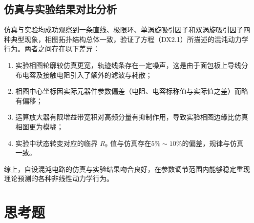 \documentclass[a4paper,8pt,twocolumn]{article}
\begin{document}
\subsection{仿真与实验结果对比分析}

仿真与实验均成功观察到一条直线、极限环、单涡旋吸引因子和双涡旋吸引因子四种典型现象，相图拓扑结构总体一致，验证了方程（DX2.1）所描述的混沌动力学行为。两者之间存在以下差异：

\begin{enumerate}[label=(\arabic*)]
  \item 实验相图轮廓较仿真更宽，轨迹线条存在一定噪声，这是由于面包板上导线分布电容及接触电阻引入了额外的滤波与耗散；
  \item 相图中心坐标因实际元器件参数偏差（电阻、电容标称值与实际值之差）而略有偏移；
  \item 运算放大器有限增益带宽积对高频分量有抑制作用，导致实验相图边缘比仿真相图更为模糊；
  \item 实验中状态转变对应的临界 $R_9$ 值与仿真存在$5\%\sim10\%$的偏差，规律与仿真一致。
\end{enumerate}

综上，自设混沌电路的仿真与实验结果吻合良好，在参数调节范围内能够稳定重现理论预测的各种非线性动力学行为。

\section{思考题}
\end{document}
